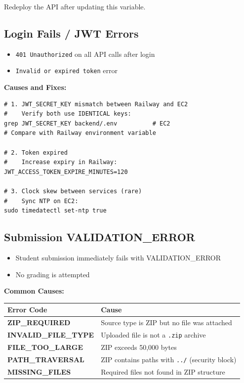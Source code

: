 \documentclass[12pt,a4paper]{article}
\begin{document}
Redeploy the API after updating this variable.

\subsection{Login Fails / JWT Errors}

\begin{troublebox}[Symptoms]
\begin{itemize}
  \item \texttt{401 Unauthorized} on all API calls after login
  \item \texttt{Invalid or expired token} error
\end{itemize}
\end{troublebox}

\textbf{Causes and Fixes:}

\begin{lstlisting}[style=terminal]
# 1. JWT_SECRET_KEY mismatch between Railway and EC2
#    Verify both use IDENTICAL keys:
grep JWT_SECRET_KEY backend/.env          # EC2
# Compare with Railway environment variable

# 2. Token expired
#    Increase expiry in Railway:
JWT_ACCESS_TOKEN_EXPIRE_MINUTES=120

# 3. Clock skew between services (rare)
#    Sync NTP on EC2:
sudo timedatectl set-ntp true
\end{lstlisting}

\subsection{Submission VALIDATION\_ERROR}

\begin{troublebox}[Symptoms]
\begin{itemize}
  \item Student submission immediately fails with VALIDATION\_ERROR
  \item No grading is attempted
\end{itemize}
\end{troublebox}

\textbf{Common Causes:}

\begin{center}
\begin{tabularx}{\linewidth}{>{\bfseries}lX}
\toprule
Error Code & Cause \\
\midrule
ZIP\_REQUIRED       & Source type is ZIP but no file was attached \\
INVALID\_FILE\_TYPE  & Uploaded file is not a \texttt{.zip} archive \\
FILE\_TOO\_LARGE     & ZIP exceeds 50,000 bytes \\
PATH\_TRAVERSAL      & ZIP contains paths with \texttt{../} (security block) \\
MISSING\_FILES       & Required files not found in ZIP structure \\
\bottomrule
\end{tabularx}
\end{center}
\end{document}
